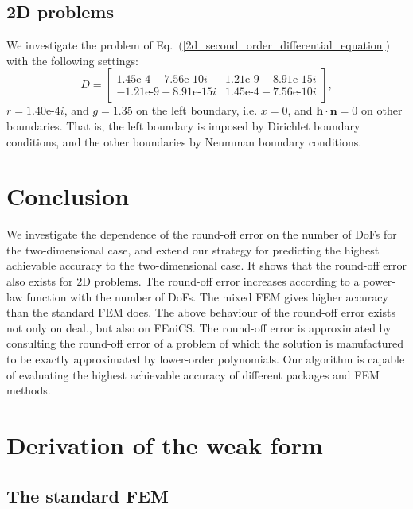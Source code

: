 \documentclass[review,3p]{elsarticle}
\begin{document}
\subsection{2D problems}
We investigate the problem of Eq.~(\ref{2d_second_order_differential_equation}) with the following settings:
\begin{equation*} \label{d_validation}
  D=
  \begin{bmatrix}
   1.45\text{e-}4-7.56\text{e-}10i & 1.21\text{e-}9-8.91\text{e-}15i \\
    -1.21\text{e-}9+8.91\text{e-}15i & 1.45\text{e-}4-7.56\text{e-}10i
  \end{bmatrix},
\end{equation*}
$r=1.40\text{e-}4i$, and $g=1.35$ on the left boundary, i.e. $x=0$, and $\mathbf{h} \cdot \mathbf{n} =0$ on other boundaries.
That is, the left boundary is imposed by Dirichlet boundary conditions, and the other boundaries by Neumman boundary conditions.
\section{Conclusion}					\label{paragraph_on_conclusion}

We investigate the dependence of the round-off error on the number of DoFs for the two-dimensional case, and extend our strategy for predicting the highest achievable accuracy to the two-dimensional case. It shows that the round-off error also exists for 2D problems. The round-off error increases according to a power-law function with the number of DoFs. The mixed FEM gives higher accuracy than the standard FEM does. The above behaviour of the round-off error exists not only on deal., but also on FEniCS. The round-off error is approximated by consulting the round-off error of a problem of which the solution is manufactured to be exactly approximated by lower-order polynomials. Our algorithm is capable of evaluating the highest achievable accuracy of different packages and FEM methods.

\appendix

\section{Derivation of the weak form}		\label{weak form appendix}

\subsection{The standard FEM}		\label{derivation_weak_form_SM}
\end{document}
